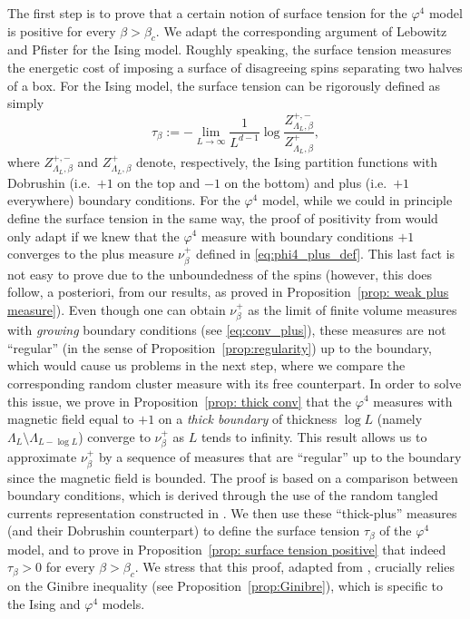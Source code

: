 \documentclass[11pt,a4paper]{article}
\theoremstyle{definition}
\numberwithin{equation}{section}
\begin{document}
The first step is to prove that a certain notion of surface tension for the $\varphi^4$ model is positive for every $\beta>\beta_c$. We adapt the corresponding argument of Lebowitz and Pfister \cite{lebowitz1981surface} for the Ising model. Roughly speaking, the surface tension measures the energetic cost of imposing a surface of disagreeing spins separating two halves of a box. For the Ising model, the surface tension can be rigorously defined as simply 
$$\tau_\beta:=-\lim_{L\to\infty}\frac{1}{L^{d-1}}\log \frac{Z^{+,-}_{\Lambda_L,\beta}}{Z^+_{\Lambda_L,\beta}},$$ where $Z^{+,-}_{\Lambda_L,\beta}$ and $Z^{+}_{\Lambda_L,\beta}$ denote, respectively, the Ising partition functions with Dobrushin (i.e.~$+1$ on the top and $-1$ on the bottom) and plus (i.e.\ $+1$ everywhere) boundary conditions. For the $\varphi^4$ model, while we could in principle define the surface tension in the same way, the proof of positivity from \cite{lebowitz1981surface} would only adapt if we knew that the $\varphi^4$ measure with boundary conditions $+1$ converges to the plus measure $\nu^+_\beta$ defined in \eqref{eq:phi4_plus_def}. This last fact is not easy to prove due to the unboundedness of the spins (however, this does follow, a posteriori, from our results, as proved in Proposition~\ref{prop: weak plus measure}). Even though one can obtain $\nu^+_\beta$ as the limit of finite volume measures with \emph{growing} boundary conditions (see \eqref{eq:conv_plus}), these measures are not ``regular'' (in the sense of Proposition~\ref{prop:regularity}) up to the boundary, which would cause us problems in the next step, where we compare the corresponding random cluster measure with its free counterpart. In order to solve this issue, we prove in Proposition~\ref{prop: thick conv} that the $\varphi^4$ measures with magnetic field equal to $+1$ on a \emph{thick boundary} of thickness $\log L$ (namely $\Lambda_L\setminus \Lambda_{L-\log L}$) converge to $\nu^+_\beta$ as $L$ tends to infinity. This result allows us to approximate $\nu^+_\beta$ by a sequence of measures that are ``regular'' up to the boundary since the magnetic field is bounded. The proof is based on a comparison between boundary conditions, which is derived through the use of the random tangled currents representation constructed in \cite{GunaratnamPanagiotisPanisSeveroPhi42022}.
We then use these ``thick-plus'' measures (and their Dobrushin counterpart) to define the surface tension $\tau_\beta$ of the $\varphi^4$ model, and to prove in Proposition~\ref{prop: surface tension positive} that indeed $\tau_\beta>0$ for every $\beta>\beta_c$. We stress that this proof, adapted from \cite{lebowitz1981surface}, crucially relies on the Ginibre inequality (see Proposition~\ref{prop:Ginibre}), which is specific to the Ising and $\varphi^4$ models.
\end{document}
